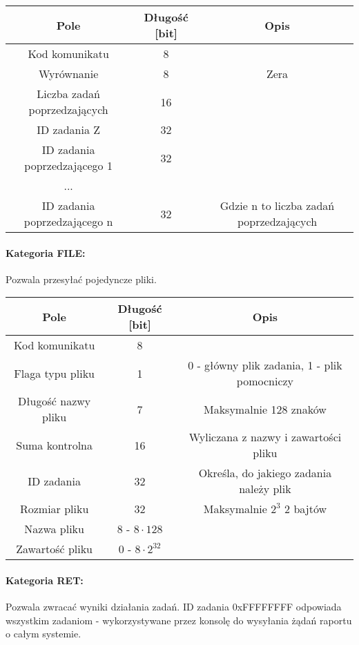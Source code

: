\documentclass[10pt,a4paper]{article}
\begin{document}
            \begin{tabular}{ c | c | c }
			    \textbf{Pole} & \textbf{Długość [bit]} & \textbf{Opis} \\
			    \hline
			    Kod komunikatu & 8 & \\
			    Wyrównanie & 8 & Zera \\
			    Liczba zadań poprzedzających & 16 & \\
			    ID zadania Z & 32 & \\
			    ID zadania poprzedzającego 1 & 32 & \\
			    ... &  &  \\
			    ID zadania poprzedzającego n & 32 & Gdzie n to liczba zadań poprzedzających \\
			\end{tabular}
			
			\paragraph{Kategoria FILE:\\}
            Pozwala przesyłać pojedyncze pliki.
            
            \begin{tabular}{ c | c | c }
			    \textbf{Pole} & \textbf{Długość [bit]} & \textbf{Opis} \\
			    \hline
			    Kod komunikatu & 8 & \\
			    Flaga typu pliku & 1 & 0 - główny plik zadania, 1 - plik pomocniczy \\
			    Długość nazwy pliku & 7 & Maksymalnie 128 znaków \\
			    Suma kontrolna & 16 & Wyliczana z nazwy i zawartości pliku \\
			    ID zadania & 32 & Określa, do jakiego zadania należy plik \\
			    Rozmiar pliku & 32 & Maksymalnie $ 2^{3} $ 2 bajtów \\
			    Nazwa pliku & 8 - $ 8 \cdot 128 $ &  \\
			    Zawartość pliku & 0 - $ 8 \cdot 2^{32} $ &  \\
			\end{tabular}
			
			\paragraph{Kategoria RET:\\}
            Pozwala zwracać wyniki działania zadań. ID zadania 0xFFFFFFFF odpowiada wszystkim zadaniom - wykorzystywane przez konsolę do wysyłania żądań raportu o całym systemie.
            
\end{document}
